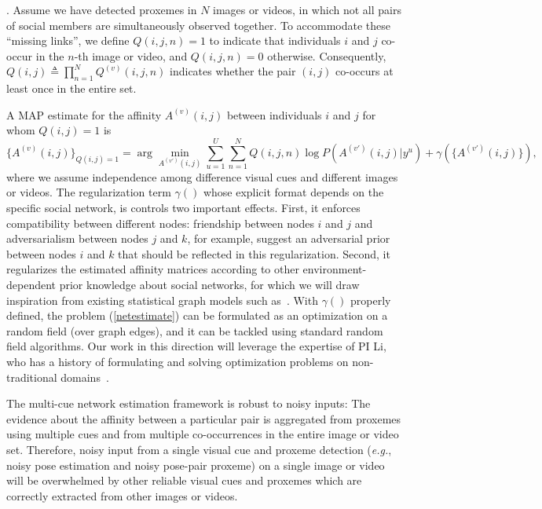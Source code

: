 . Assume we have detected proxemes in $N$ images or videos, in which not all pairs of social members are simultaneously observed together. To accommodate these ``missing links'', we define $Q(i,j,n)=1$ to indicate that individuals $i$ and $j$ co-occur in the $n$-th image or video, and $Q(i,j,n)=0$ otherwise. Consequently, $Q(i,j)\triangleq\prod_{n=1}^{N}Q^{(v)}(i,j,n)$ indicates whether the pair $(i, j)$ co-occurs at least once in the entire set.


A MAP estimate for the affinity $A^{(v)}(i,j)$ between individuals $i$ and $j$ for whom $Q (i,j)=1$ is
\begin{equation}
\{A^{(v)}(i,j)\}_{Q(i,j)=1}=\arg\!\!\!\!\!\min_{A^{(v')}(i,j)}\sum_{u=1}^{U}\sum_{n=1}^{N}Q(i,j,n)\log P(A^{(v')}(i,j)|y^u)+\gamma(\{A^{(v')}(i,j)\}),
\label{netestimate}
\end{equation}
where we assume independence among difference visual cues and different images or videos. The regularization term $\gamma()$ whose explicit format depends on the specific social network, is controls two important effects. First, it enforces compatibility between different nodes: friendship between nodes $i$ and $j$ and adversarialism between nodes $j$ and $k$, for example, suggest an adversarial prior between nodes $i$ and $k$ that should be reflected in this regularization. Second, it regularizes the estimated affinity matrices according to other environment-dependent prior knowledge about social networks, for which we will draw inspiration from existing statistical graph models such as~\cite{Goldenberg}. With $\gamma()$ properly defined, the problem (\ref{netestimate}) can be formulated as an optimization on a random field (over graph edges), and it can be tackled using standard random field algorithms. Our work in this direction will leverage the expertise of PI Li, who has a history of formulating and solving optimization problems on non-traditional domains~\cite{LiPAMI2012}.

The multi-cue network estimation framework is robust to noisy inputs: The evidence about the affinity between a particular pair is aggregated from proxemes using multiple cues and from multiple co-occurrences in the entire image or video set. Therefore, noisy input from a single visual cue and proxeme detection (\emph{e.g.}, noisy pose estimation and noisy pose-pair proxeme) on a single image or video will be overwhelmed by other reliable visual cues and proxemes which are correctly extracted from other images or videos.

